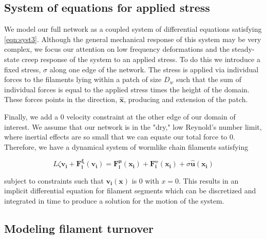\documentclass[10pt,letterpaper]{article}
\begin{document}
\subsection*{System of equations for applied stress}
We model our full network as a coupled system of differential equations satisfying \ref{eqn:syst3}.  Although the general mechanical response of this system may be very complex, we focus our attention on low frequency deformations and the steady-state creep response of the system to an applied stress.  To do this we introduce a fixed stress, $\sigma$ along one edge of the network.  The stress is applied via individual forces to the filaments lying within a patch of size $D_w$ such that the sum of individual forces is equal to the applied stress times the height of the domain.  These forces points in the direction, $\mathbf{\hat{x}}$, producing and extension of the patch.

Finally, we add a 0 velocity constraint at the other edge of our domain of interest.  We assume that our network is in the "dry," low Reynold's number limit, where inertial effects are so small that we can equate our total force to 0.  Therefore, we have a dynamical system of wormlike chain filaments satisfying

\begin{equation}
\label{eqn:systfull}
L\zeta\mathbf{ v_i} +\mathbf{F^{\xi}_i(v_i)}= \mathbf{F^{\mu}_i(x_i)}+\mathbf{F^{\upsilon}_i(x_i)} + \sigma\mathbf{\hat{u}(x_i)}
\end{equation}

subject to constraints such that $\mathbf{v_i(x)}$ is 0 with $x=0$.  This results in an implicit differential equation for filament segments which can be discretized and integrated in time to produce a solution for the motion of the system.


\subsection*{Modeling filament turnover}
\end{document}
